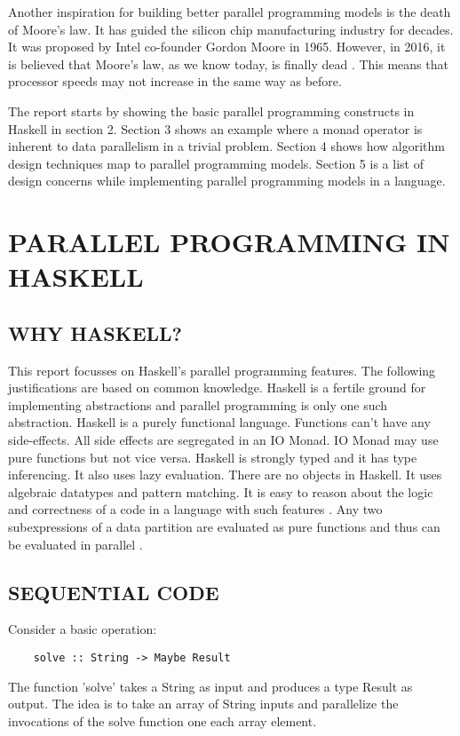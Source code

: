 \documentclass[12pt,a4paper]{article}
\begin{document}
	Another inspiration for building better parallel programming models is the death of Moore’s law. It has guided the silicon chip manufacturing industry for decades. It was proposed by Intel co-founder Gordon Moore in 1965. However, in 2016, it is believed that Moore’s law, as we know today, is finally dead \cite{arstechnica}. This means that processor speeds may not increase in the same way as before. \par
	The report starts by showing the basic parallel programming constructs in Haskell in section 2. Section 3 shows an example where a monad operator is inherent to data parallelism in a trivial problem. Section 4 shows how algorithm design techniques map to parallel programming models. Section 5 is a list of design concerns while implementing parallel programming models in a language.
	 
	\section{\large PARALLEL PROGRAMMING IN HASKELL}
	\subsection{WHY HASKELL?}
	\indent \par This report focusses on Haskell’s parallel programming features. The following justifications are based on common knowledge. Haskell is a fertile ground for implementing abstractions and parallel programming is only one such abstraction. Haskell is a purely functional language. Functions can’t have any side-effects. All side effects are segregated in an IO Monad. IO Monad may use pure functions but not vice versa. Haskell is strongly typed and it has type inferencing. It also uses lazy evaluation. There are no objects in Haskell. It uses algebraic datatypes and pattern matching. It is easy to reason about the logic and correctness of a code in a language with such features \cite{marlow}. Any two subexpressions of a data partition are evaluated as pure functions and thus can be evaluated in parallel \cite{hammond}.
    
    \subsection{SEQUENTIAL CODE}
    Consider a basic operation:
    \lstset{}
	\begin{lstlisting}
	solve :: String -> Maybe Result
	\end{lstlisting}
The function 'solve' takes a String as input and produces a type Result as output. The idea is to take an array of String inputs and parallelize the invocations of the solve function one each array element.
\end{document}
